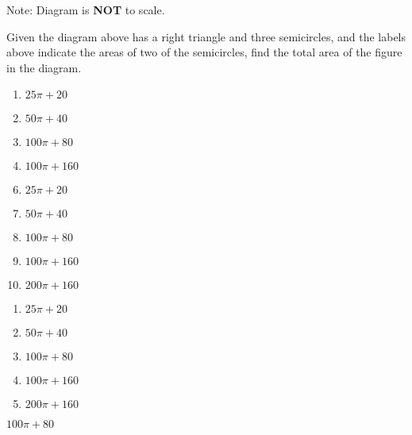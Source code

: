 

Note: Diagram is \textbf{NOT} to scale.

Given the diagram above has a right triangle and three semicircles, and the labels above indicate the areas of two of the semicircles, find the total area of the figure in the diagram.



\ifsat
	\begin{enumerate}[label=\Alph*)]
		\item $25\pi+20$
		\item $50\pi+40$
		\item $100\pi+80$%
		\item $100\pi+160$
	\end{enumerate}
\else
\fi

\ifacteven
	\begin{enumerate}[label=\textbf{\Alph*.},itemsep=\fill,align=left]
		\setcounter{enumii}{5}
		\item $25\pi+20$
		\item $50\pi+40$
		\item $100\pi+80$%
		\addtocounter{enumii}{1}
		\item $100\pi+160$
		\item $200\pi+160$
	\end{enumerate}
\else
\fi

\ifactodd
	\begin{enumerate}[label=\textbf{\Alph*.},itemsep=\fill,align=left]
		\item $25\pi+20$
		\item $50\pi+40$
		\item $100\pi+80$%
		\item $100\pi+160$
		\item $200\pi+160$
	\end{enumerate}
\else
\fi

\ifgridin
 $100\pi+80$%
		
\else
\fi

